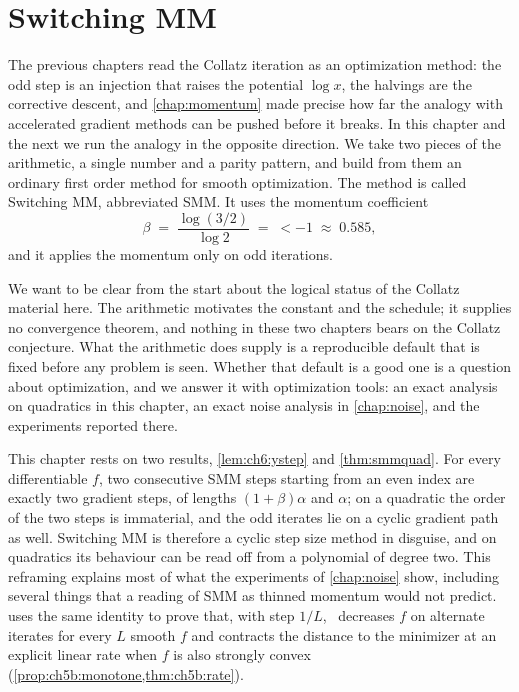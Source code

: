 \chapter{Switching MM}\label{chap:smm}

The previous chapters read the Collatz iteration as an optimization method:
the odd step is an injection that raises the potential $\log x$, the halvings
are the corrective descent, and \cref{chap:momentum} made precise how far the
analogy with accelerated gradient methods can be pushed before it breaks. In
this chapter and the next we run the analogy in the opposite direction. We
take two pieces of the arithmetic, a single number and a parity pattern, and
build from them an ordinary first order method for smooth optimization. The
method is called Switching MM, abbreviated SMM. It uses the momentum
coefficient
\[
  \beta \;=\; \frac{\log(3/2)}{\log 2} \;=\; \lt-1 \;\approx\; 0.585,
\]
and it applies the momentum only on odd iterations.

We want to be clear from the start about the logical status of the Collatz
material here. The arithmetic motivates the constant and the schedule; it
supplies no convergence theorem, and nothing in these two chapters bears on
the Collatz conjecture. What the arithmetic does supply is a reproducible
default that is fixed before any problem is seen. Whether that default is a
good one is a question about optimization, and we answer it with optimization
tools: an exact analysis on quadratics in this chapter, an exact noise
analysis in \cref{chap:noise}, and the experiments reported there.

This chapter rests on two results, \cref{lem:ch6:ystep} and \cref{thm:smmquad}. For every differentiable $f$, two consecutive SMM steps starting from an even index are exactly two gradient steps, of lengths $(1+\beta)\alpha$ and $\alpha$; on a quadratic the order of the two steps is immaterial, and the odd iterates lie on a cyclic gradient path as well. Switching MM is therefore a cyclic step size method in disguise, and on quadratics its behaviour can be read off from a polynomial of degree two. This reframing explains most of what the experiments of \cref{chap:noise} show, including several things that a reading of SMM as thinned momentum would not predict.  uses the same identity to prove that, with step $1/L$, \smmdet\ decreases $f$ on alternate iterates for every $L$ smooth $f$ and contracts the distance to the minimizer at an explicit linear rate when $f$ is also strongly convex (\cref{prop:ch5b:monotone,thm:ch5b:rate}).

